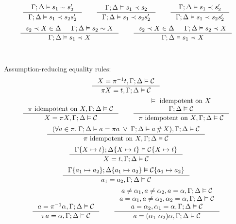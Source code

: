 \documentclass[english, mgr]{iithesis}
\begin{document}
\begin{appendices}
$$\inference{
  \cEnv ; \icEnv \vDash \shape_1 \csheq \shape_2'
}{
  \cEnv ; \icEnv \vDash \shape_1 \cshlt \shape_2 \shape_2'
}
\qquad
\inference{
  \cEnv ; \icEnv \vDash \shape_1 \cshlt \shape_2
}{
  \cEnv ; \icEnv \vDash \shape_1 \cshlt \shape_2 \shape_2'
}
\qquad
\inference{
  \cEnv ; \icEnv \vDash \shape_1 \cshlt \shape_2'
}{
  \cEnv ; \icEnv \vDash \shape_1 \cshlt \shape_2 \shape_2'
}
$$
$$\inference{
  \shape_2 \cshlt \termv \in \icEnv
  &
  \cEnv ; \icEnv \vDash \shape_2 \csheq \termv
}{
  \cEnv ; \icEnv \vDash \shape_1 \cshlt \termv
}
\qquad
\inference{
  \shape_2 \cshlt \termv \in \icEnv
  &
  \cEnv ; \icEnv \vDash \shape_2 \cshlt \termv
}{
  \cEnv ; \icEnv \vDash \shape_1 \cshlt \termv
}
$$
\\
\\
Assumption-reducing equality rules:
$$
\inference{
   \termv = \pi^{-1} \term, \cEnv ; \icEnv \vDash \sconstr
}{
   \pi \termv = \term, \cEnv ; \icEnv \vDash \sconstr
}
$$
$$
\inference{
  \pi \text{ idempotent on } \termv, \cEnv ; \icEnv \vDash \sconstr
}{
   \termv = \pi \termv, \cEnv ; \icEnv \vDash \sconstr
}
\qquad
\inference{
  \vDash \text{ idempotent on } \termv \\
  \cEnv ; \icEnv \vDash \sconstr
}{
   \pi \text{ idempotent on } \termv, \cEnv ; \icEnv \vDash \sconstr
}
$$
$$
\inference{
  (\forall \atomv \in \pi.\;
    \cEnv ; \icEnv \vDash \atomv = \pi \atomv \;\vee\;
    \cEnv ; \icEnv \vDash \atomv \cfresh \termv), \cEnv ; \icEnv \vDash \sconstr
}{
\pi \text{ idempotent on } \termv, \cEnv ; \icEnv \vDash \sconstr
}
$$
$$
\inference{
   \cEnv\subst{\termv}{\term} ; \icEnv\subst{\termv}{\term} \vDash \sconstr\subst{\termv}{\term}
}{
   \termv = \term, \cEnv ; \icEnv \vDash \sconstr
}
$$
$$
\inference{
   \cEnv \subst{\atomv_1}{\atomv_2}; \icEnv\subst{\atomv_1}{\atomv_2} \vDash \sconstr\subst{\atomv_1}{\atomv_2}
}{
  \atomv_1 \ceq \atomv_2, \cEnv ; \icEnv \vDash \sconstr
}
$$
$$
\inference{
  \atomv \ceq \pi^{-1} \atomexp, \cEnv ; \icEnv \vDash \sconstr
}{
  \pi \atomv \ceq \atomexp, \cEnv ; \icEnv \vDash \sconstr
}
\qquad
\inference{
  \atomv \cneq \atomexp_1, \atomv \cneq \atomexp_2, \atomv     \ceq \atomexp, \cEnv ; \icEnv \vDash \sconstr \\
  \atomv \ceq  \atomexp_1, \atomv \cneq \atomexp_2, \atomexp_2 \ceq \atomexp, \cEnv ; \icEnv \vDash \sconstr \\
                           \atomv \ceq  \atomexp_2, \atomexp_1 \ceq \atomexp, \cEnv ; \icEnv \vDash \sconstr
}{
  \atomv \ceq \permswap{\atomexp_1}{\atomexp_2} \atomexp, \cEnv ; \icEnv \vDash \sconstr
}$$
\end{appendices}
\end{document}
